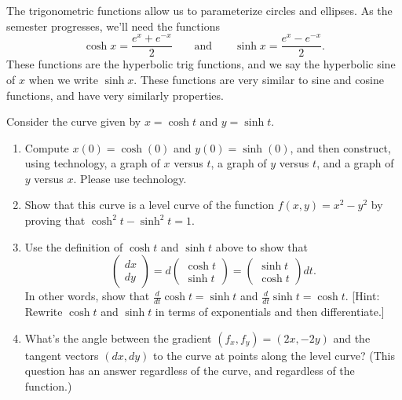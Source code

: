 The trigonometric functions allow us to parameterize circles and ellipses. 
As the semester progresses, we'll need the functions 
$$\cosh x = \frac{e^x+e^{-x}}{2}\quad\quad \text{and}\quad \quad  \sinh x= \frac{e^x-e^{-x}}{2}.$$  
These functions are the hyperbolic trig functions, and we say the hyperbolic sine of $x$ when we write $\sinh x$.
These functions are very similar to sine and cosine functions, and have very similarly properties.  


\begin{problem}
Consider the curve given by $x=\cosh t$ and $y=\sinh t$.
\begin{enumerate}
 \item 
Compute $x(0) = \cosh(0)$ and $y(0)=\sinh(0)$, and then construct, using technology, a graph of $x$ versus $t$, a graph of $y$ versus $t$, and a graph of $y$ versus $x$. Please use technology.
 \item Show that this curve is a level curve of the function $f(x,y) = x^2-y^2$ by proving that $\cosh^2 t-\sinh^2t=1$. 
 \item Use the definition of $\cosh t$ and $\sinh t$ above to show that 
$$
\begin{pmatrix}
 dx\\dy
\end{pmatrix}
=
d\begin{pmatrix}
 \cosh t\\ \sinh t
\end{pmatrix}
=
\begin{pmatrix}
 \sinh t\\ \cosh t
\end{pmatrix}dt.$$ 
In other words, show that $\frac{d}{dt}\cosh t = \sinh t$ and $\frac{d}{dt}\sinh t = \cosh t$. [Hint: Rewrite $\cosh t$ and $\sinh t$ in terms of exponentials and then differentiate.]
\item What's the angle between the gradient $(f_x, f_y) = (2x,-2y)$ and the tangent vectors $(dx,dy)$ to the curve at points along the level curve? (This question has an answer regardless of the curve, and regardless of the function.)
\end{enumerate}

\end{problem}




\subsection*{\ideaB}


